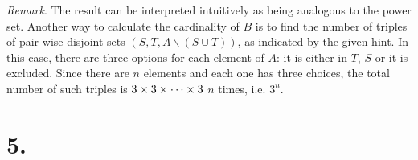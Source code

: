 \documentclass[12pt]{article}
\newenvironment{ps}
{\begin{enumerate}[leftmargin=0em, itemindent=1.5em]}
{\end{enumerate}}
\begin{document}
\begin{ps}
    \textit{Remark}. The result can be interpreted intuitively as being analogous to the power set.
    Another way to calculate the cardinality of \( B \) is to find the number of triples of
    pair-wise disjoint sets \( (S, T, A \backslash (S \cup T)) \), as indicated by the given hint. In this case,
    there are three options for each element of \( A \): it is either in \( T \), \( S \) or it is
    excluded. Since there are \( n \) elements and each one has three choices, the total number of
    such triples is \( 3 \times 3 \time 3 \times \dots \times 3 \) \( n \) times, i.e. \( 3^n \).

\end{ps}



\section*{5.}
\end{document}
